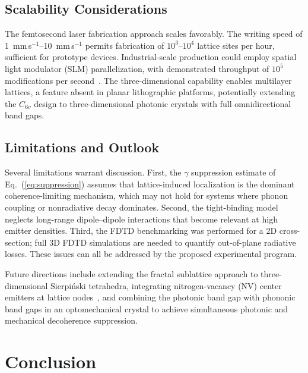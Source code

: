 \documentclass[10pt,letterpaper]{article}
\begin{document}
\subsection{Scalability Considerations}

The femtosecond laser fabrication approach scales favorably. The writing speed of 1~mm\,s$^{-1}$--10~mm\,s$^{-1}$ permits fabrication of $10^3$--$10^4$ lattice sites per hour, sufficient for prototype devices. Industrial-scale production could employ spatial light modulator (SLM) parallelization, with demonstrated throughput of $10^5$ modifications per second~\cite{Davis1996}. The three-dimensional capability enables multilayer lattices, a feature absent in planar lithographic platforms, potentially extending the $C_{6v}$ design to three-dimensional photonic crystals with full omnidirectional band gaps.

\subsection{Limitations and Outlook}

Several limitations warrant discussion. First, the $\gamma$ suppression estimate of Eq.~(\ref{eq:suppression}) assumes that lattice-induced localization is the dominant coherence-limiting mechanism, which may not hold for systems where phonon coupling or nonradiative decay dominates. Second, the tight-binding model neglects long-range dipole--dipole interactions that become relevant at high emitter densities. Third, the FDTD benchmarking was performed for a 2D cross-section; full 3D FDTD simulations are needed to quantify out-of-plane radiative losses. These issues can all be addressed by the proposed experimental program.

Future directions include extending the fractal sublattice approach to three-dimensional Sierpi\'{n}ski tetrahedra, integrating nitrogen-vacancy (NV) center emitters at lattice nodes~\cite{Aharonovich2016,Childress2006}, and combining the photonic band gap with phononic band gaps in an optomechanical crystal to achieve simultaneous photonic and mechanical decoherence suppression.


\section{Conclusion}
\label{sec:conclusion}
\end{document}
